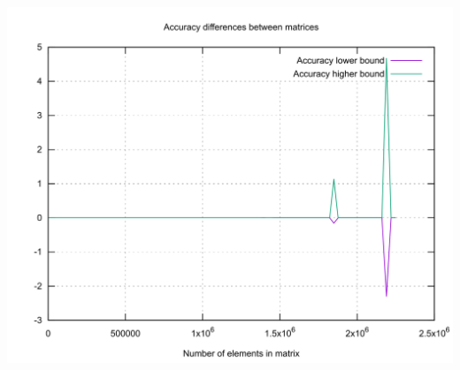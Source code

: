 \documentclass[11pt, a4paper]{article}
\begin{document}
\begin{appendices}
    \includegraphics[width=\textwidth]{../../resources/float_accuracy.png}
\end{appendices}
\end{document}
